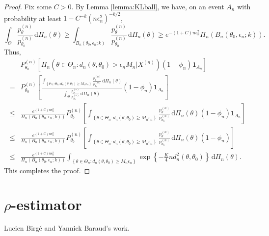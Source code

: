 \documentclass[11pt]{article}
\theoremstyle{plain}
\theoremstyle{definition}
\theoremstyle{remark}
\begin{document}
\begin{proof}
    Fix some $C>0$.
    By Lemma \ref{lemma:KLball}, we have, on an event $A_n$ with probability at least $1-C^{-k} (n\epsilon_n^2)^{-k/2}$,
    \begin{equation*}
        \int_{\Theta}
\frac{p_{\theta}^{(n)}}{p_{\theta_0}^{(n)}}
\, \mathrm d \Pi_n (\theta) 
\geq
\int_{B_n\left( \theta_0, \epsilon_n ; k \right)}
\frac{p_{\theta}^{(n)}}{p_{\theta_0}^{(n)}}
\, \mathrm d \Pi_n (\theta) 
\geq
e^{-(1+C) n \epsilon_n^2} 
\Pi_n \left( B_n \left( \theta_0, \epsilon_n ; k \right) \right).
    \end{equation*}
    Thus,
    \begin{align*}
    &
    P_{\theta_0}^{(n)} \left[ 
        \Pi_n \left(
            \theta \in \Theta_n : d_n (\theta,\theta_0) >   \epsilon_n M_n
        |X^{(n)} \right) (1-\phi_n) \mathbf 1_{A_n} 
    \right]    
    \\
    =&
    P_{\theta_0}^{(n)} \left[ 
        \frac{
        \int_{
            \left\{ \theta \in \Theta_n :  d_n (\theta, \theta_0) \geq M_n \epsilon_n  \right\}
            } \frac{p_{\theta}^{(n)}}{p_{\theta_0}^{(n)}} 
            \, \mathrm d \Pi_n \left( \theta \right)
        }{
        \int_\Theta
             \frac{p_{\theta}^{(n)}}{p_{\theta_0}^{(n)}} 
            \, \mathrm d \Pi_n \left( \theta \right)
        }  
        (1-\phi_n) \mathbf 1_{A_n} 
    \right]    
    \\
    \leq &
        \frac{
e^{(1+C) n \epsilon_n^2} 
        }{
\Pi_n \left( B_n \left( \theta_0, \epsilon_n ; k \right) \right)
        }  
    P_{\theta_0}^{(n)} \left[ 
        \int_{
            \left\{ \theta \in \Theta_n :  d_n (\theta, \theta_0) \geq M_n \epsilon_n  \right\}
            } \frac{p_{\theta}^{(n)}}{p_{\theta_0}^{(n)}} 
            \, \mathrm d \Pi_n \left( \theta \right)
        (1-\phi_n) \mathbf 1_{A_n} 
    \right]    
    \\
    \leq &
        \frac{
e^{(1+C) n \epsilon_n^2} 
        }{
\Pi_n \left( B_n \left( \theta_0, \epsilon_n ; k \right) \right)
        }  
    P_{\theta_0}^{(n)} \left[ 
        \int_{
            \left\{ \theta \in \Theta_n :  d_n (\theta, \theta_0) \geq M_n \epsilon_n  \right\}
            } \frac{p_{\theta}^{(n)}}{p_{\theta_0}^{(n)}} 
            \, \mathrm d \Pi_n \left( \theta \right)
        (1-\phi_n)
    \right]    
    \\
    \leq &
        \frac{
e^{(1+C) n \epsilon_n^2} 
        }{
\Pi_n \left( B_n \left( \theta_0, \epsilon_n ; k \right) \right)
        }  
        \int_{
            \left\{ \theta \in \Theta_n :  d_n (\theta, \theta_0) \geq M_n \epsilon_n  \right\}
        } 
            \exp \left\{-\frac{K}{4}n d_n^2(\theta,\theta_0) \right\}
            \, \mathrm d \Pi_n \left( \theta \right).
    \end{align*}
This completes the proof.

\end{proof}


\section{$\rho$-estimator}
Lucien Birg\'e and Yannick Baraud's work.






\end{document}
